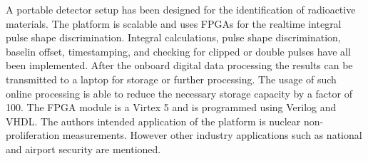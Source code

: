 \documentclass[12pt]{article}
\begin{document}
{\large\textbf{\cite{Schiffer2011491}}}
A portable detector setup has been designed for the identification of radioactive materials. The platform is scalable and uses FPGAs for the realtime integral pulse shape discrimination. Integral calculations, pulse shape discrimination, baselin offset, timestamping, and checking for clipped or double pulses have all been implemented. After the onboard digital data processing the results can be transmitted to a laptop for storage or further processing. The usage of such online processing is able to reduce the necessary storage capacity by a factor of 100. The FPGA module is a Virtex 5 and is programmed using Verilog and VHDL. The authors intended application of the platform is nuclear non-proliferation measurements. However other industry applications such as national and airport security are mentioned.
\\[20pt]





\end{document}
